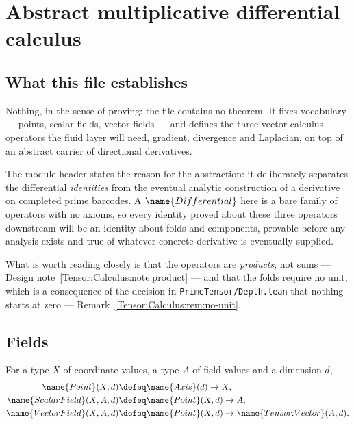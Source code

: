 
\section{Abstract multiplicative differential calculus}
\label{Tensor:Calculus:sec}


\subsection*{What this file establishes}

Nothing, in the sense of proving: the file contains no theorem.  It fixes
vocabulary --- points, scalar fields, vector fields --- and defines the three
vector-calculus operators the fluid layer will need, gradient, divergence and
Laplacian, on top of an abstract carrier of directional derivatives.

The module header states the reason for the abstraction: it deliberately
separates the differential \emph{identities} from the eventual analytic
construction of a derivative on completed prime barcodes.  A
$\name{Differential}$ here is a bare family of operators with no axioms, so
every identity proved about these three operators downstream will be an
identity about folds and components, provable before any analysis exists and
true of whatever concrete derivative is eventually supplied.

What is worth reading closely is that the operators are \emph{products}, not
sums --- Design note~\ref{Tensor:Calculus:note:product} --- and that the folds
require no unit, which is a consequence of the decision in
\texttt{PrimeTensor/Depth.lean} that nothing starts at zero ---
Remark~\ref{Tensor:Calculus:rem:no-unit}.

\subsection{Fields}

\begin{definition}
\label{Tensor:Calculus:def:fields}
For a type $X$ of coordinate values, a type $A$ of field values and a dimension
$d$,
\begin{align*}
  \name{Point}(X,d) &\defeq \name{Axis}(d) \to X, \\
  \name{ScalarField}(X,A,d) &\defeq \name{Point}(X,d) \to A, \\
  \name{VectorField}(X,A,d) &\defeq
    \name{Point}(X,d) \to \name{Tensor.Vector}(A,d).
\end{align*}
\end{definition}

